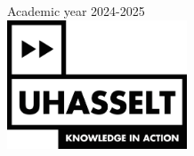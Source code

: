 \documentclass[openany]{book}
\begin{document}
\begin{titlepage}

{\large Academic year 2024-2025}\\[2cm]


\includegraphics[width=0.4\textwidth]{Images/uhasselt.jpg}\\
 

\vfill %

\end{titlepage}
\end{document}
